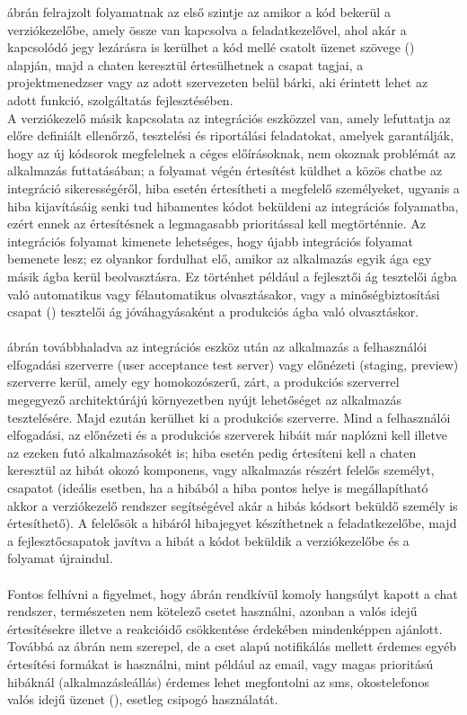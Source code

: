  ábrán felrajzolt folyamatnak az első szintje az amikor a kód bekerül a verziókezelőbe, amely össze van kapcsolva a feladatkezelővel, ahol akár a kapcsolódó jegy lezárásra is kerülhet a kód mellé csatolt üzenet szövege () alapján, majd a chaten keresztül értesülhetnek a csapat tagjai, a projektmenedzser vagy az adott szervezeten belül bárki, aki érintett lehet az adott funkció, szolgáltatás fejlesztésében.\\
A verziókezelő másik kapcsolata az integrációs eszközzel van, amely lefuttatja az előre definiált ellenőrző, tesztelési és riportálási feladatokat, amelyek garantálják, hogy az új kódsorok megfelelnek a céges előírásoknak, nem okoznak problémát az alkalmazás futtatásában; a folyamat végén értesítést küldhet a közös chatbe az integráció sikerességéről, hiba esetén értesítheti a megfelelő személyeket, ugyanis a hiba kijavításáig senki tud hibamentes kódot beküldeni az integrációs folyamatba, ezért ennek az értesítésnek a legmagasabb prioritással kell megtörténnie. Az integrációs folyamat kimenete lehetséges, hogy újabb integrációs folyamat bemenete lesz; ez olyankor fordulhat elő, amikor az alkalmazás egyik ága egy másik ágba kerül beolvasztásra. Ez történhet például a fejlesztői ág tesztelői ágba való automatikus vagy félautomatikus olvasztásakor, vagy a minőségbiztosítási csapat () tesztelői ág jóváhagyásaként a produkciós ágba való olvasztáskor.\\
\hfill\\
 ábrán továbbhaladva az integrációs eszköz után az alkalmazás a felhasználói elfogadási szerverre (user acceptance test server) vagy előnézeti (staging, preview) szerverre kerül, amely egy homokozószerű, zárt, a produkciós szerverrel megegyező architektúrájú környezetben nyújt lehetőséget az alkalmazás tesztelésére. Majd ezután kerülhet ki a produkciós szerverre. Mind a felhasználói elfogadási, az előnézeti és a produkciós szerverek hibáit már naplózni kell illetve az ezeken futó alkalmazásokét is; hiba esetén pedig értesíteni kell a chaten keresztül az hibát okozó komponens, vagy alkalmazás részért felelős személyt, csapatot (ideális esetben, ha a hibából a hiba pontos helye is megállapítható akkor a verziókezelő rendszer segítségével akár a hibás kódsort beküldő személy is értesíthető). A felelősök a hibáról hibajegyet készíthetnek a feladatkezelőbe, majd a fejlesztőcsapatok javítva a hibát a kódot beküldik a verziókezelőbe és a folyamat újraindul.\\
\hfill\\
Fontos felhívni a figyelmet, hogy  ábrán rendkívül komoly hangsúlyt kapott a chat rendszer, természeten nem kötelező csetet használni, azonban a valós idejű értesítésekre illetve a reakcióidő csökkentése érdekében mindenképpen ajánlott. Továbbá az ábrán nem szerepel, de a cset alapú notifikálás mellett érdemes egyéb értesítési formákat is használni, mint például az email, vagy magas prioritású hibáknál (alkalmazásleállás) érdemes lehet megfontolni az sms, okostelefonos valós idejű üzenet (), esetleg csipogó használatát.

